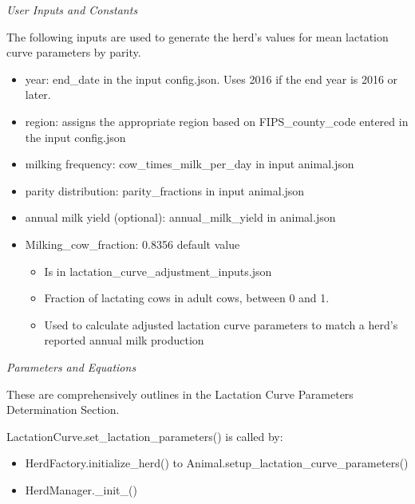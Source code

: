 \begin{refsection}
\begin{enumerate}
         \textit{User Inputs and Constants}
         \vspace{0.1cm}

         The following inputs are used to generate the herd’s values for mean lactation curve parameters by parity. 
            
         \begin{itemize}
             \item year: end\_date in the input config.json. Uses 2016 if the end year is 2016 or later.  
             \item region: assigns the appropriate region based on FIPS\_county\_code entered in the input config.json  
             \item milking frequency: cow\_times\_milk\_per\_day in input animal.json 
             \item parity distribution: parity\_fractions in input animal.json 
             \item annual milk yield (optional): annual\_milk\_yield in animal.json 
             \item Milking\_cow\_fraction: 0.8356 default value 
             \begin{itemize}
                 \item Is in lactation\_curve\_adjustment\_inputs.json 
                 \item Fraction of lactating cows in adult cows, between 0 and 1. 
                 \item Used to calculate adjusted lactation curve parameters to match a herd’s reported annual milk production 
             \end{itemize}
         \end{itemize}
         
         \textit{Parameters and Equations}
         \vspace{0.1cm}

         These are comprehensively outlines in the Lactation Curve Parameters Determination Section.
        \vspace{0.1cm}
        
         LactationCurve.set\_lactation\_parameters() is called by:
         \begin{itemize}
             \item HerdFactory.initialize\_herd() to Animal.setup\_lactation\_curve\_parameters() 
             \item HerdManager.\_init\_() 

         \end{itemize}
        \vspace{0.2cm}
        

\end{enumerate}
\end{refsection}
